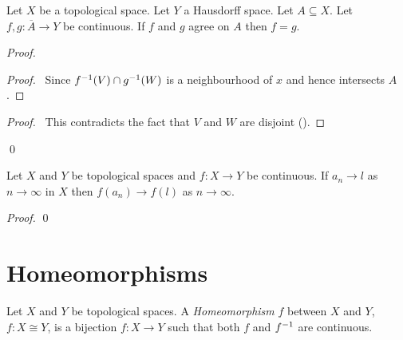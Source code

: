 \begin{proposition}
    Let $X$ be a topological space. Let $Y$ a Hausdorff space. Let $A \subseteq X$. Let $f, g : \overline{A} \rightarrow Y$ be continuous.
    If $f$ and $g$ agree on $A$ then $f = g$.
\end{proposition}

\begin{proof}
    \pf
    \begin{proof}
        \pf\ Since ${f}^{-1}(V) \cap {g}^{-1}(W)$ is a neighbourhood of $x$ and hence intersects $A$.
    \end{proof}
    \qedstep
    \begin{proof}
        \pf\ This contradicts the fact that $V$ and $W$ are disjoint ().
    \end{proof}
    \qed
\end{proof}

\begin{proposition}
    \label{proposition:converge_continuous}
    Let $X$ and $Y$ be topological spaces and $f : X \rightarrow Y$ be continuous. If $a_n \rightarrow l$ as $n \rightarrow \infty$ in $X$ then
    $f(a_n) \rightarrow f(l)$ as $n \rightarrow \infty$.
\end{proposition}

\begin{proof}
    \pf
    \qed
\end{proof}

\section{Homeomorphisms}

\begin{definition}[Homeomorphism]
    Let $X$ and $Y$ be topological spaces. A \emph{Homeomorphism} $f$ between $X$ and $Y$, $f : X \cong Y$,
    is a bijection $f : X \rightarrow Y$ such that both $f$ and ${f}^{-1}$ are continuous.
\end{definition}

